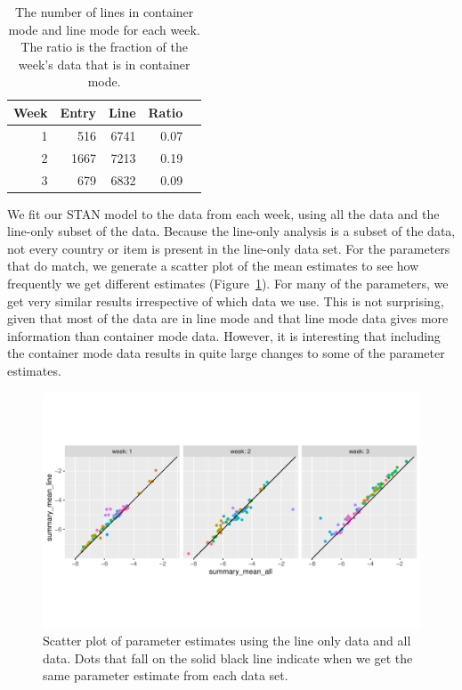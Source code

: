 \documentclass[aoas]{imsart}
\begin{document}
\begin{table}[ht]
\caption{The number of lines in container mode and line mode for each week. The ratio is the fraction of the week's data that is in container mode.}
\label{tab:real_data_summary}
\centering
\begin{tabular}{rrrrr}
  \hline
 Week & Entry & Line & Ratio  \\ 
  \hline
 1 & 516 & 6741 & 0.07 \\ 
  2 & 1667 & 7213 & 0.19 \\ 
   3 & 679 & 6832 & 0.09 \\ 
   \hline
\end{tabular}
\end{table}


We fit our STAN model to the data from each week, using all the data and the line-only subset of the data. Because the line-only analysis is a subset of the data, not every country or item is present in the line-only data set. For the parameters that do match, we generate a scatter plot of the mean estimates to see how frequently we get different estimates (Figure~\ref{fig:case_study_scatter}). For many of the parameters, we get very similar results irrespective of which data we use. This is not surprising, given that most of the data are in line mode and that line mode data gives more information than container mode data. However, it is interesting that including the container mode data results in quite large changes to some of the parameter estimates. 

\begin{figure}[h!]
\includegraphics[width=\textwidth]{../visualisations/figures/p_int_est_all_vs_line_data.pdf}
\caption{Scatter plot of parameter estimates using the line only data and all data. Dots that fall on the solid black line indicate when we get the same parameter estimate from each data set.}
\label{fig:case_study_scatter}
\end{figure}
\end{document}
